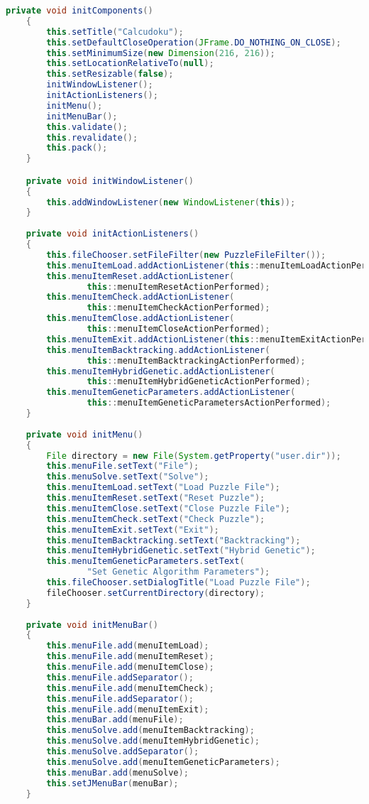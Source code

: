 \begin{lstlisting}[language=Java,basicstyle=\tiny,caption=Calcudoku.java]
    private void initComponents()
    { 
        this.setTitle("Calcudoku");
        this.setDefaultCloseOperation(JFrame.DO_NOTHING_ON_CLOSE);
        this.setMinimumSize(new Dimension(216, 216));
        this.setLocationRelativeTo(null);
        this.setResizable(false);
        initWindowListener();
        initActionListeners();
        initMenu();
        initMenuBar();
        this.validate();
        this.revalidate();
        this.pack();
    }

    private void initWindowListener()
    {
        this.addWindowListener(new WindowListener(this));
    }
    
    private void initActionListeners()
    {
        this.fileChooser.setFileFilter(new PuzzleFileFilter());      
        this.menuItemLoad.addActionListener(this::menuItemLoadActionPerformed);
        this.menuItemReset.addActionListener(
                this::menuItemResetActionPerformed);
        this.menuItemCheck.addActionListener(
                this::menuItemCheckActionPerformed);
        this.menuItemClose.addActionListener(
                this::menuItemCloseActionPerformed);
        this.menuItemExit.addActionListener(this::menuItemExitActionPerformed);
        this.menuItemBacktracking.addActionListener(
                this::menuItemBacktrackingActionPerformed);
        this.menuItemHybridGenetic.addActionListener(
                this::menuItemHybridGeneticActionPerformed);
        this.menuItemGeneticParameters.addActionListener(
                this::menuItemGeneticParametersActionPerformed);
    }
    
    private void initMenu()
    {
        File directory = new File(System.getProperty("user.dir"));
        this.menuFile.setText("File");
        this.menuSolve.setText("Solve");
        this.menuItemLoad.setText("Load Puzzle File");
        this.menuItemReset.setText("Reset Puzzle");
        this.menuItemClose.setText("Close Puzzle File");
        this.menuItemCheck.setText("Check Puzzle");
        this.menuItemExit.setText("Exit");
        this.menuItemBacktracking.setText("Backtracking");
        this.menuItemHybridGenetic.setText("Hybrid Genetic");
        this.menuItemGeneticParameters.setText(
                "Set Genetic Algorithm Parameters");
        this.fileChooser.setDialogTitle("Load Puzzle File");
        fileChooser.setCurrentDirectory(directory);
    }
    
    private void initMenuBar()
    {
        this.menuFile.add(menuItemLoad);
        this.menuFile.add(menuItemReset);
        this.menuFile.add(menuItemClose);
        this.menuFile.addSeparator();
        this.menuFile.add(menuItemCheck);
        this.menuFile.addSeparator();
        this.menuFile.add(menuItemExit);
        this.menuBar.add(menuFile);
        this.menuSolve.add(menuItemBacktracking);
        this.menuSolve.add(menuItemHybridGenetic);
        this.menuSolve.addSeparator();
        this.menuSolve.add(menuItemGeneticParameters);
        this.menuBar.add(menuSolve);
        this.setJMenuBar(menuBar);
    }
    

\end{lstlisting}
